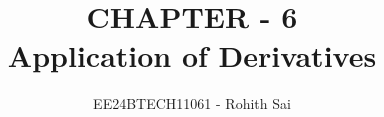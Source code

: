 \documentclass[journal]{IEEEtran}
\begin{document}

\vspace{3cm}

\title{CHAPTER - 6\\Application of Derivatives}
\author{EE24BTECH11061 - Rohith Sai}
{\let\newpage\relax\maketitle}

\renewcommand{\thefigure}{\theenumi}
\renewcommand{\thetable}{\theenumi}
\setlength{\intextsep}{10pt} %

\renewcommand{\thetable}{\theenumi}
\end{document}
